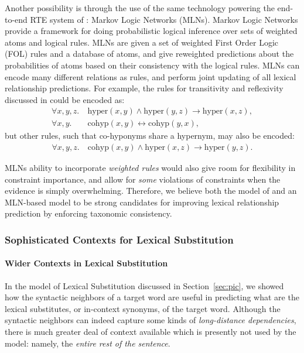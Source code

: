 \documentclass[12pt]{article}
\begin{document}
Another possibility is through the use of the same technology powering the
end-to-end RTE system of : Markov Logic Networks
(MLNs).  Markov Logic Networks provide a framework for doing probabilistic
logical inference over sets of weighted atoms and logical rules. MLNs are given
a set of weighted First Order Logic (FOL) rules and a database of atoms, and
give reweighted predictions about the probabilities of atoms based on their
consistency with the logical rules. MLNs can encode many
different relations as rules, and perform joint updating of all lexical
relationship predictions.  For example, the rules for transitivity and reflexivity
discussed in  could be encoded as:
\begin{align*}
  \forall x,y,z. &~\text{hyper}(x,y) \wedge \text{hyper}(y, z) \rightarrow \text{hyper}(x, z),\\
  \forall x,y. &~\text{cohyp}(x,y) \leftrightarrow \text{cohyp}(y,x),
\end{align*}
but other rules, such that co-hyponyms share a hypernym, may also be encoded:
\begin{align*}
  \forall x,y,z. &~\text{cohyp}(x,y) \wedge \text{hyper}(x,z) \rightarrow \text{hyper}(y,z).
\end{align*}

MLNs ability to incorporate {\em weighted rules} would also give room for
flexibility in constraint importance, and allow for {\em some} violations of
constraints when the evidence is simply overwhelming. Therefore, we believe
both the model of  and an MLN-based model to be strong
candidates for improving lexical relationship prediction by enforcing taxonomic
consistency.

\subsubsection{Sophisticated Contexts for Lexical Substitution}

\paragraph{Wider Contexts in Lexical Substitution}
In the model of Lexical Substitution discussed in Section~\ref{sec:pic}, we
showed how the syntactic neighbors of a target word are useful in predicting
what are the lexical substitutes, or in-context synonyms, of the target word.
Although the syntactic neighbors can indeed capture some kinds of {\em long-distance
dependencies}, there is much greater deal of context available which is
presently not used by the model: namely, the {\em entire rest of the sentence}.
\end{document}
